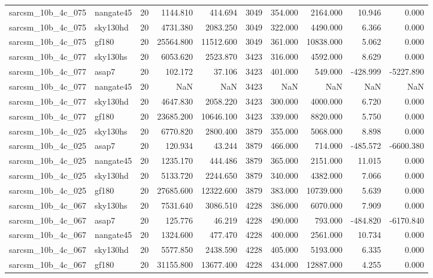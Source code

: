\documentclass{article}
\begin{document}
\begin{longtable}{llrrrrrrrr}
sarcsm\_10b\_4c\_075 & nangate45 & 20 & 1144.810 & 414.694 & 3049 & 354.000 & 2164.000 & 10.946 & 0.000 \\
sarcsm\_10b\_4c\_075 & sky130hd & 20 & 4731.380 & 2083.250 & 3049 & 322.000 & 4490.000 & 6.366 & 0.000 \\
sarcsm\_10b\_4c\_075 & gf180 & 20 & 25564.800 & 11512.600 & 3049 & 361.000 & 10838.000 & 5.062 & 0.000 \\
sarcsm\_10b\_4c\_077 & sky130hs & 20 & 6053.620 & 2523.870 & 3423 & 316.000 & 4592.000 & 8.629 & 0.000 \\
sarcsm\_10b\_4c\_077 & asap7 & 20 & 102.172 & 37.106 & 3423 & 401.000 & 549.000 & -428.999 & -5227.890 \\
sarcsm\_10b\_4c\_077 & nangate45 & 20 & NaN & NaN & 3423 & NaN & NaN & NaN & NaN \\
sarcsm\_10b\_4c\_077 & sky130hd & 20 & 4647.830 & 2058.220 & 3423 & 300.000 & 4000.000 & 6.720 & 0.000 \\
sarcsm\_10b\_4c\_077 & gf180 & 20 & 23685.200 & 10646.100 & 3423 & 339.000 & 8820.000 & 5.750 & 0.000 \\
sarcsm\_10b\_4c\_025 & sky130hs & 20 & 6770.820 & 2800.400 & 3879 & 355.000 & 5068.000 & 8.898 & 0.000 \\
sarcsm\_10b\_4c\_025 & asap7 & 20 & 120.934 & 43.244 & 3879 & 466.000 & 714.000 & -485.572 & -6600.380 \\
sarcsm\_10b\_4c\_025 & nangate45 & 20 & 1235.170 & 444.486 & 3879 & 365.000 & 2151.000 & 11.015 & 0.000 \\
sarcsm\_10b\_4c\_025 & sky130hd & 20 & 5133.720 & 2244.650 & 3879 & 340.000 & 4382.000 & 7.066 & 0.000 \\
sarcsm\_10b\_4c\_025 & gf180 & 20 & 27685.600 & 12322.600 & 3879 & 383.000 & 10739.000 & 5.639 & 0.000 \\
sarcsm\_10b\_4c\_067 & sky130hs & 20 & 7531.640 & 3086.510 & 4228 & 386.000 & 6070.000 & 7.909 & 0.000 \\
sarcsm\_10b\_4c\_067 & asap7 & 20 & 125.776 & 46.219 & 4228 & 490.000 & 793.000 & -484.820 & -6170.840 \\
sarcsm\_10b\_4c\_067 & nangate45 & 20 & 1324.600 & 477.470 & 4228 & 400.000 & 2561.000 & 10.734 & 0.000 \\
sarcsm\_10b\_4c\_067 & sky130hd & 20 & 5577.850 & 2438.590 & 4228 & 405.000 & 5193.000 & 6.335 & 0.000 \\
sarcsm\_10b\_4c\_067 & gf180 & 20 & 31155.800 & 13677.400 & 4228 & 434.000 & 12887.000 & 4.255 & 0.000 \\

\end{longtable}
\end{document}
